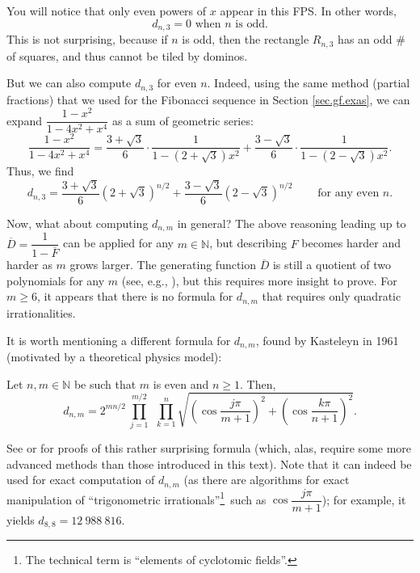 You will notice that only even powers of $x$ appear in this FPS. In other
words,%
\[
d_{n,3}=0\text{ when }n\text{ is odd.}%
\]
This is not surprising, because if $n$ is odd, then the rectangle $R_{n,3}$
has an odd \# of squares, and thus cannot be tiled by dominos.

But we can also compute $d_{n,3}$ for even $n$. Indeed, using the same method
(partial fractions) that we used for the Fibonacci sequence in Section
\ref{sec.gf.exas}, we can expand $\dfrac{1-x^{2}}{1-4x^{2}+x^{4}}$ as a sum of
geometric series:%
\[
\dfrac{1-x^{2}}{1-4x^{2}+x^{4}}=\dfrac{3+\sqrt{3}}{6}\cdot\dfrac{1}{1-\left(
2+\sqrt{3}\right)  x^{2}}+\dfrac{3-\sqrt{3}}{6}\cdot\dfrac{1}{1-\left(
2-\sqrt{3}\right)  x^{2}}.
\]
Thus, we find%
\[
d_{n,3}=\dfrac{3+\sqrt{3}}{6}\left(  2+\sqrt{3}\right)  ^{n/2}+\dfrac
{3-\sqrt{3}}{6}\left(  2-\sqrt{3}\right)  ^{n/2}\ \ \ \ \ \ \ \ \ \ \text{for
any even }n.
\]


Now, what about computing $d_{n,m}$ in general? The above reasoning leading up
to $\overline{D}=\dfrac{1}{1-\overline{F}}$ can be applied for any
$m\in\mathbb{N}$, but describing $F$ becomes harder and harder as $m$ grows
larger. The generating function $\overline{D}$ is still a quotient of two
polynomials for any $m$ (see, e.g., \cite{KlaPol79}), but this requires more
insight to prove. For $m\geq6$, it appears that there is no formula for
$d_{n,m}$ that requires only quadratic irrationalities.

It is worth mentioning a different formula for $d_{n,m}$, found by Kasteleyn
in 1961 (motivated by a theoretical physics model):

\begin{theorem}
Let $n,m\in\mathbb{N}$ be such that $m$ is even and
$n\geq1$. Then,%
\[
d_{n,m}=2^{mn/2}\ \prod_{j=1}^{m/2}\ \ \prod_{k=1}^{n}\sqrt{\left(  \cos
\dfrac{j\pi}{m+1}\right)  ^{2}+\left(  \cos\dfrac{k\pi}{n+1}\right)  ^{2}}.
\]

\end{theorem}

See \cite[Theorem 12.85]{Loehr-BC} or \cite{Stucky15} for proofs of this
rather surprising formula (which, alas, require some more advanced methods
than those introduced in this text). Note that it can indeed be used for exact
computation of $d_{n,m}$ (as there are algorithms for exact manipulation of
\textquotedblleft trigonometric irrationals\textquotedblright\footnote{The
technical term is \textquotedblleft elements of cyclotomic
fields\textquotedblright.}\ such as $\cos\dfrac{j\pi}{m+1}$); for example, it
yields $d_{8,8}=12\ 988\ 816$.
